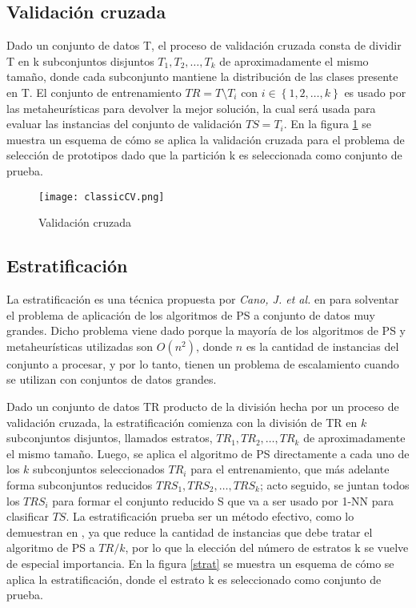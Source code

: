 \subsection{Validación cruzada}

Dado un conjunto de datos T, el proceso de validación cruzada \cite{kohavi1995study} consta de dividir T en k subconjuntos disjuntos $T_1,T_2,\dots,T_k$ de aproximadamente el mismo tamaño, donde cada subconjunto mantiene la distribución de las clases presente en T. El conjunto de entrenamiento $TR = T \setminus T_i$ con $i \in \left\{1,2,\dots,k\right\}$ es usado por las metaheurísticas para devolver la mejor solución, la cual será usada para evaluar las instancias del conjunto de validación $ TS = T_i $. En la figura \ref{crossval} se muestra un esquema de cómo se aplica la validación cruzada para el problema de selección de prototipos dado que la partición k es seleccionada como conjunto de prueba.

\begin{figure}[h!]
\centering
\texttt{[image: classicCV.png]}
\caption[Validación cruzada]{Validación cruzada}
\label{crossval}
\end{figure}

\subsection{Estratificación}

La estratificación es una técnica propuesta por \emph{Cano, J. et al.} en \cite{cano2005stratification} para solventar el problema de aplicación de los algoritmos de PS a conjunto de datos muy grandes. Dicho problema viene dado porque la mayoría de los algoritmos de PS y metaheurísticas utilizadas son $O(n^2)$, donde $n$ es la cantidad de instancias del conjunto a procesar, y por lo tanto, tienen un problema de escalamiento cuando se utilizan con conjuntos de datos grandes.

Dado un conjunto de datos TR producto de la división hecha por un proceso de validación cruzada, la estratificación comienza con la división de TR en $k$ subconjuntos disjuntos, llamados estratos, $TR_1,TR_2,\dots,TR_k$ de aproximadamente el mismo tamaño. Luego, se aplica el algoritmo de PS directamente a cada uno de los $k$ subconjuntos seleccionados $TR_i$ para el entrenamiento, que más adelante forma subconjuntos reducidos $TRS_1,TRS_2,\dots,TRS_k$; acto seguido, se juntan todos los $TRS_i$ para formar el conjunto reducido S que va a ser usado por 1-NN para clasificar $TS$. La estratificación prueba ser un método efectivo, como lo demuestran en \cite{cano2005stratification}, ya que reduce la cantidad de instancias que debe tratar el algoritmo de PS a $TR/k$, por lo que la elección del número de estratos k se vuelve de especial importancia. En la figura \ref{strat} se muestra un esquema de cómo se aplica la estratificación, donde el estrato k es seleccionado como conjunto de prueba.

